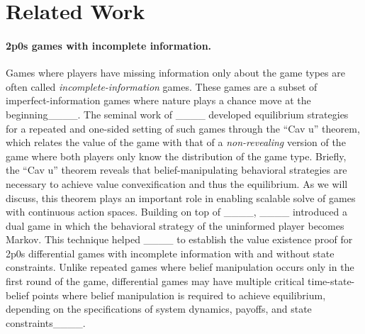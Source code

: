 \section{Related Work}
\vspace{-0.1in}
\paragraph{2p0s games with incomplete information.}
Games where players have missing information only about the game types are often called \textit{incomplete-information} games. These games are a subset of imperfect-information games where nature plays a chance move at the beginning____. The seminal work of ____ developed equilibrium strategies for a repeated and one-sided setting of such games through the ``Cav u'' theorem, which relates the value of the game with that of a \textit{non-revealing} version of the game where both players only know the distribution of the game type. Briefly, the ``Cav u'' theorem reveals that belief-manipulating behavioral strategies are necessary to achieve value convexification and thus the equilibrium. As we will discuss, this theorem plays an important role in enabling scalable solve of games with continuous action spaces.
Building on top of ____, ____ introduced a dual game in which the behavioral strategy of the uninformed player becomes Markov. This technique helped ____ to establish the value existence proof for 2p0s differential games with incomplete information with and without state constraints. Unlike repeated games where belief manipulation occurs only in the first round of the game, differential games may have multiple critical time-state-belief points where belief manipulation is required to achieve equilibrium, depending on the specifications of system dynamics, payoffs, and state constraints____. 
\vspace{-0.12in}
